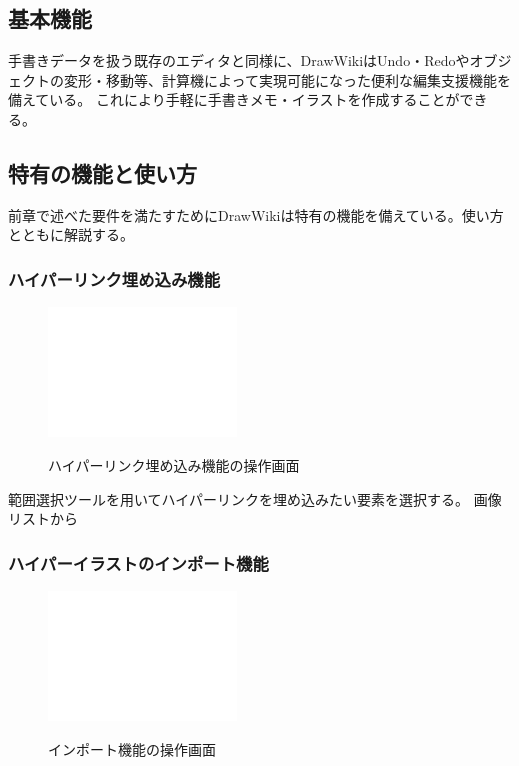 \subsection{基本機能}
手書きデータを扱う既存のエディタと同様に、DrawWikiはUndo・Redoやオブジェクトの変形・移動等、計算機によって実現可能になった便利な編集支援機能を備えている。
これにより手軽に手書きメモ・イラストを作成することができる。

\subsection{特有の機能と使い方}
前章で述べた要件を満たすためにDrawWikiは特有の機能を備えている。使い方とともに解説する。

\subsubsection{ハイパーリンク埋め込み機能}

\begin{figure}[htbp]
    \begin{center}
    {\includegraphics[width=50mm]{images/testimage.png}} \end{center}
    \caption{ハイパーリンク埋め込み機能の操作画面}
    \label{hyperlinking}
\end{figure}

範囲選択ツールを用いてハイパーリンクを埋め込みたい要素を選択する。
画像リストから

\subsubsection{ハイパーイラストのインポート機能}

\begin{figure}[htbp]
    \begin{center}
    {\includegraphics[width=50mm]{images/testimage.png}} \end{center}
    \caption{インポート機能の操作画面}
    \label{importing}
\end{figure}

